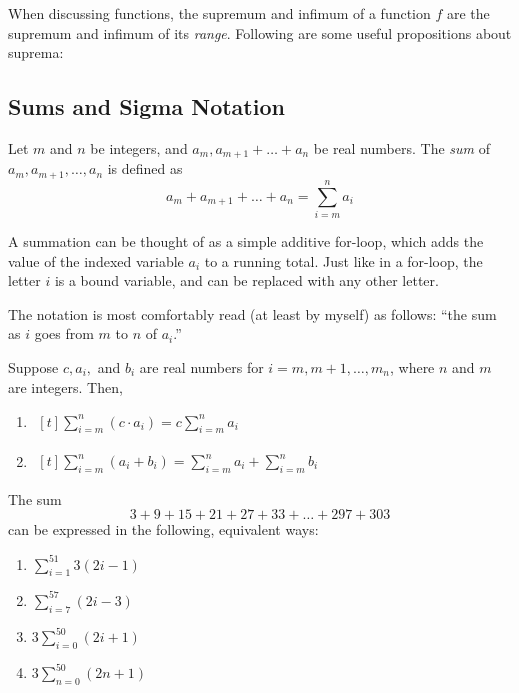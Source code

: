 \documentclass{article}
\begin{document}
      When discussing functions, the supremum and infimum of a function \(f\) are the supremum and infimum of its \emph{range}. Following are some useful propositions about suprema:


      \subsection{Sums and Sigma Notation}
      \begin{defi}
        Let \(m\) and \(n\) be integers, and \(a_m, a_{m+1} + \ldots + a_n\) be real numbers. The \emph{sum} of \(a_m, a_{m+1}, \ldots, a_n\) is defined as 
        \[
          a_m + a_{m+1} + \ldots + a_n = \sum_{i = m}^{n}{a_i}
        \]

      \end{defi}

      A summation can be thought of as a simple additive for-loop, which adds the value of the indexed variable \(a_i\) to a running total. Just like in a for-loop, the letter \(i\) is a bound variable, and can be replaced with any other letter.
      
      The notation is most comfortably read (at least by myself) as follows: ``the sum as \(i\) goes from \(m\) to \(n\) of \(a_i\).''

      \begin{prop}
        Suppose \(c, a_i,\) and \(b_i\) are real numbers for \(i = m, m+1, \ldots, m_n\), where \(n\) and \(m\) are integers. Then,
        \begin{enumerate}
          \item \(\begin{aligned}[t]
                    \sum_{i = m}^{n}{(c \cdot a_i)} = c \sum_{i = m}^{n}{a_i}
                 \end{aligned}\)
          \item \(\begin{aligned}[t]
                    \sum_{i = m}^{n}{(a_i + b_i)} = \sum_{i = m}^{n}{a_i} + \sum_{i = m}^{n}{b_i}
                  \end{aligned}\)
      \end{enumerate}
      \end{prop}

      \begin{eg}
        The sum 
        \[
          3 + 9 + 15 + 21 + 27 + 33 + \ldots  + 297 + 303
        \]
        can be expressed in the following, equivalent ways:

        \begin{enumerate}
          \item \(\sum_{i = 1}^{51}{3(2i - 1)}\)
          \item \(\sum_{i = 7}^{57}{(2i - 3)}\)
          \item \(3\sum_{i = 0}^{50}{(2i+1)}\)
          \item \(3\sum_{n = 0}^{50}{(2n+1)}\)
        \end{enumerate}
      \end{eg}
\end{document}

